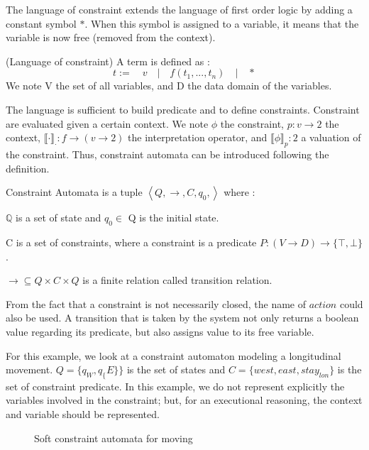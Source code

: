 The language of constraint extends the language of first order logic by adding a constant symbol $*$. When this symbol is assigned to a variable, it means that the variable is now free (removed from the context). 
\begin{definition} (Language of constraint) A term is defined as :
	$$ t := \quad v \quad | \quad f(t_1, ..., t_n) \quad | \quad * $$
We note V the set of all variables, and D the data domain of the variables.
\end{definition}
The language is sufficient to build predicate and to define constraints. Constraint are evaluated given a certain context. We note $\phi$ the constraint, $p: v \rightarrow 2$ the context, $\llbracket \cdot \rrbracket_{\cdot} : f \rightarrow (v \rightarrow 2)$ the interpretation operator, and $\llbracket \phi \rrbracket_{p} : 2$ a valuation of the constraint.
 Thus, constraint automata can be introduced following the definition.
\begin{definition}
	Constraint Automata is a tuple $\left\langle Q, \rightarrow, C, q_{0}, \right\rangle$ where : 
	\begin{list}{-}{ }
		\item $\mathbb{Q}$ is a set of state and $q_0\in$ Q is the initial state.
		\item C is a set of constraints, where a constraint is a predicate $P: (V \rightarrow D) \rightarrow \{\top,\bot\}$.
		\item $\rightarrow \subseteq Q \times C \times Q$ is a finite relation called transition relation.
	\end{list}
\end{definition}
From the fact that a constraint is not necessarily closed, the name of $action$ could also be used. A transition that is taken by the system not only returns a boolean value regarding its predicate, but also assigns value to its free variable.
\begin{example}For this example, we look at a constraint automaton modeling a longitudinal movement. $Q=\{q_{W},q_\{E\}\} $ is the set of states and $C=\{west,east,stay_{lon}\} $ is the set of constraint predicate. In this example, we do not represent explicitly the variables involved in the constraint; but, for an executional reasoning, the context and variable should be represented.\\
	\begin{figure}[H]
		\centering
		\resizebox{8cm}{!}{}
		\caption{Soft constraint automata for moving}\label{fig:myfigure}
	\end{figure}
\end{example}

